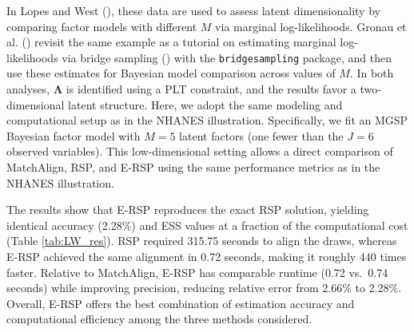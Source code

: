 \documentclass[
  man,
  longtable,
  nolmodern,
  notxfonts,
  notimes,
  colorlinks=true,linkcolor=blue,citecolor=blue,urlcolor=blue]{apa7}
\theoremstyle{plain}
\theoremstyle{plain}
\theoremstyle{remark}
\begin{document}
In Lopes and West (), these data
are used to assess latent dimensionality by comparing factor models with
different \(M\) via marginal log-likelihoods. Gronau et al.
() revisit the same example as a tutorial
on estimating marginal log-likelihoods via bridge sampling
() with the
\texttt{bridgesampling} package, and then use these estimates for
Bayesian model comparison across values of \(M\). In both analyses,
\(\mathbf\Lambda\) is identified using a PLT constraint, and the results
favor a two-dimensional latent structure. Here, we adopt the same
modeling and computational setup as in the NHANES illustration.
Specifically, we fit an MGSP Bayesian factor model with \(M=5\) latent
factors (one fewer than the \(J=6\) observed variables). This
low-dimensional setting allows a direct comparison of MatchAlign, RSP,
and E-RSP using the same performance metrics as in the NHANES
illustration.

The results show that E-RSP reproduces the exact RSP solution, yielding
identical accuracy (2.28\%) and ESS values at a fraction of the
computational cost (Table \ref{tab:LW_res}). RSP required 315.75 seconds
to align the draws, whereas E-RSP achieved the same alignment in 0.72
seconds, making it roughly 440 times faster. Relative to MatchAlign,
E-RSP has comparable runtime (0.72 vs.~0.74 seconds) while improving
precision, reducing relative error from 2.66\% to 2.28\%. Overall, E-RSP
offers the best combination of estimation accuracy and computational
efficiency among the three methods considered.
\end{document}

